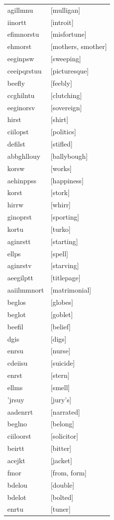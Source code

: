 \documentclass{article}
\begin{document}
\begin{tabular}{ll}
agillmnu & [mulligan] \\
iinortt & [introit] \\
efimnorstu & [misfortune] \\
ehmorst & [mothers, smother] \\
eeginpsw & [sweeping] \\
ceeipqrstuu & [picturesque] \\
beefly & [feebly] \\
ccghilntu & [clutching] \\
eeginorsv & [sovereign] \\
hirst & [shirt] \\
ciilopst & [politics] \\
defilst & [stifled] \\
abbghllouy & [ballybough] \\
korsw & [works] \\
aehinppss & [happiness] \\
korst & [stork] \\
hirrw & [whirr] \\
ginoprst & [sporting] \\
kortu & [turko] \\
aginrstt & [starting] \\
ellps & [spell] \\
aginrstv & [starving] \\
aeegilptt & [titlepage] \\
aaiilmmnort & [matrimonial] \\
beglos & [globes] \\
beglot & [goblet] \\
beefil & [belief] \\
dgis & [digs] \\
enrsu & [nurse] \\
cdeiisu & [suicide] \\
enrst & [stern] \\
ellms & [smell] \\
'jrsuy & [jury's] \\
aadenrrt & [narrated] \\
beglno & [belong] \\
ciiloorst & [solicitor] \\
beirtt & [bitter] \\
acejkt & [jacket] \\
fmor & [from, form] \\
bdelou & [double] \\
bdelot & [bolted] \\
enrtu & [tuner] \\

\end{tabular}
\end{document}
